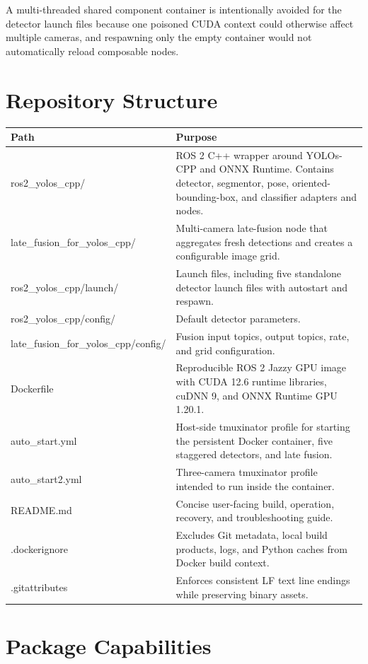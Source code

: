 \documentclass[11pt,a4paper]{article}
\begin{document}
A multi-threaded shared component container is intentionally avoided for the detector launch files because one poisoned CUDA context could otherwise affect multiple cameras, and respawning only the empty container would not automatically reload composable nodes.

\section{Repository Structure}

\begin{longtable}{>{\ttfamily}p{} p{}}
\toprule
\normalfont\textbf{Path} & \textbf{Purpose} \\
\midrule
\endhead
ros2\_yolos\_cpp/ & ROS 2 C++ wrapper around YOLOs-CPP and ONNX Runtime. Contains detector, segmentor, pose, oriented-bounding-box, and classifier adapters and nodes. \\
late\_fusion\_for\_yolos\_cpp/ & Multi-camera late-fusion node that aggregates fresh detections and creates a configurable image grid. \\
ros2\_yolos\_cpp/launch/ & Launch files, including five standalone detector launch files with autostart and respawn. \\
ros2\_yolos\_cpp/config/ & Default detector parameters. \\
late\_fusion\_for\_yolos\_cpp/config/ & Fusion input topics, output topics, rate, and grid configuration. \\
Dockerfile & Reproducible ROS 2 Jazzy GPU image with CUDA 12.6 runtime libraries, cuDNN 9, and ONNX Runtime GPU 1.20.1. \\
auto\_start.yml & Host-side tmuxinator profile for starting the persistent Docker container, five staggered detectors, and late fusion. \\
auto\_start2.yml & Three-camera tmuxinator profile intended to run inside the container. \\
README.md & Concise user-facing build, operation, recovery, and troubleshooting guide. \\
.dockerignore & Excludes Git metadata, local build products, logs, and Python caches from Docker build context. \\
.gitattributes & Enforces consistent LF text line endings while preserving binary assets. \\
\bottomrule
\end{longtable}

\section{Package Capabilities}
\end{document}
